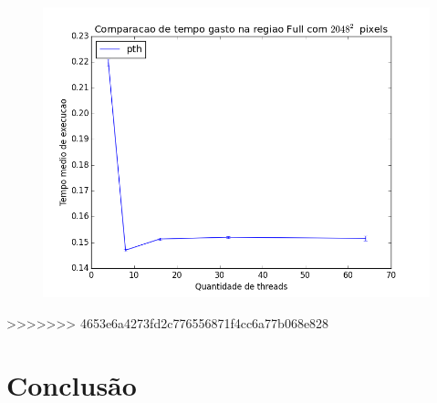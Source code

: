 \documentclass[12pt]{article}
\begin{document}
\begin{figure}[H]
    \centering
    \includegraphics[scale=.5]{time_x_thread_numpth.png}
\end{figure}

>>>>>>> 4653e6a4273fd2c776556871f4cc6a77b068e828
\section{Conclusão}
\newpage
\end{document}
